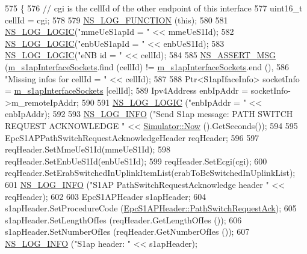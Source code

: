 \begin{DoxyCode}
575 \{
576   \textcolor{comment}{// cgi is the cellId of the other endpoint of this interface}
577   uint16\_t cellId = cgi;
578 
579   \hyperlink{log-macros-disabled_8h_a90b90d5bad1f39cb1b64923ea94c0761}{NS\_LOG\_FUNCTION} (\textcolor{keyword}{this});
580 
581   \hyperlink{group__logging_ga88acd260151caf2db9c0fc84997f45ce}{NS\_LOG\_LOGIC}(\textcolor{stringliteral}{"mmeUeS1apId = "} << mmeUeS1Id);
582   \hyperlink{group__logging_ga88acd260151caf2db9c0fc84997f45ce}{NS\_LOG\_LOGIC}(\textcolor{stringliteral}{"enbUeS1apId = "} << enbUeS1Id);
583   \hyperlink{group__logging_ga88acd260151caf2db9c0fc84997f45ce}{NS\_LOG\_LOGIC}(\textcolor{stringliteral}{"eNB id = "} << cellId);
584 
585   \hyperlink{assert_8h_aff5ece9066c74e681e74999856f08539}{NS\_ASSERT\_MSG} (\hyperlink{classns3_1_1EpcS1apMme_a415a57f1b3b88750ecf99e6bf3187476}{m\_s1apInterfaceSockets}.find (cellId) != 
      \hyperlink{classns3_1_1EpcS1apMme_a415a57f1b3b88750ecf99e6bf3187476}{m\_s1apInterfaceSockets}.end (),
586                \textcolor{stringliteral}{"Missing infos for cellId = "} << cellId);
587 
588   Ptr<S1apIfaceInfo> socketInfo = \hyperlink{classns3_1_1EpcS1apMme_a415a57f1b3b88750ecf99e6bf3187476}{m\_s1apInterfaceSockets} [cellId];
589   Ipv4Address enbIpAddr = socketInfo->m\_remoteIpAddr;
590 
591   \hyperlink{group__logging_ga88acd260151caf2db9c0fc84997f45ce}{NS\_LOG\_LOGIC} (\textcolor{stringliteral}{"enbIpAddr = "} << enbIpAddr);
592 
593   \hyperlink{group__logging_gafbd73ee2cf9f26b319f49086d8e860fb}{NS\_LOG\_INFO} (\textcolor{stringliteral}{"Send S1ap message: PATH SWITCH REQUEST ACKNOWLEDGE "} << 
      \hyperlink{classns3_1_1Simulator_ac3178fa975b419f7875e7105be122800}{Simulator::Now} ().GetSeconds());
594 
595   EpcS1APPathSwitchRequestAcknowledgeHeader reqHeader;
596   
597   reqHeader.SetMmeUeS1Id(mmeUeS1Id);
598   reqHeader.SetEnbUeS1Id(enbUeS1Id);
599   reqHeader.SetEcgi(cgi);
600   reqHeader.SetErabSwitchedInUplinkItemList(erabToBeSwitchedInUplinkList);
601   \hyperlink{group__logging_gafbd73ee2cf9f26b319f49086d8e860fb}{NS\_LOG\_INFO} (\textcolor{stringliteral}{"S1AP PathSwitchRequestAcknowledge header "} << reqHeader);
602 
603   EpcS1APHeader s1apHeader;
604   s1apHeader.SetProcedureCode (\hyperlink{classns3_1_1EpcS1APHeader_aedd7ba8568bf04ce8960bd840712a63ea4c73b45629052b31f0636b3ba4b9d58f}{EpcS1APHeader::PathSwitchRequestAck});
605   s1apHeader.SetLengthOfIes (reqHeader.GetLengthOfIes ());
606   s1apHeader.SetNumberOfIes (reqHeader.GetNumberOfIes ());
607   \hyperlink{group__logging_gafbd73ee2cf9f26b319f49086d8e860fb}{NS\_LOG\_INFO} (\textcolor{stringliteral}{"S1ap header: "} << s1apHeader);

\end{DoxyCode}
